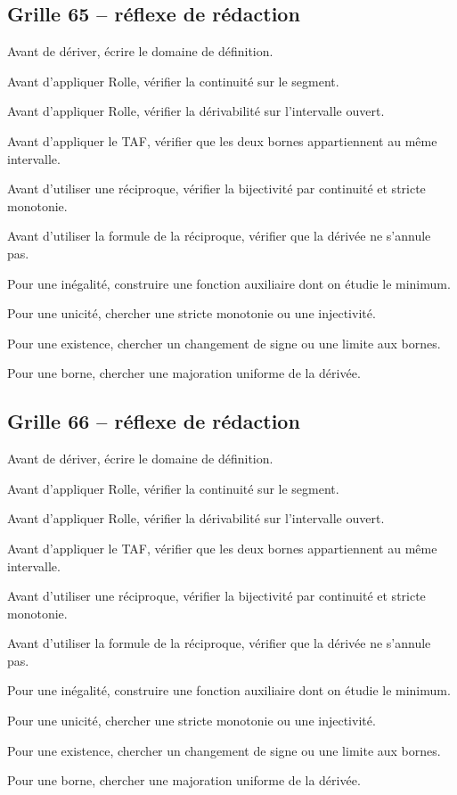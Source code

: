 \documentclass[11pt,a4paper]{article}
\begin{document}
\subsection*{Grille 65 -- réflexe de rédaction}

\begin{methodebox}

Avant de dériver, écrire le domaine de définition.

Avant d'appliquer Rolle, vérifier la continuité sur le segment.

Avant d'appliquer Rolle, vérifier la dérivabilité sur l'intervalle ouvert.

Avant d'appliquer le TAF, vérifier que les deux bornes appartiennent au même intervalle.

Avant d'utiliser une réciproque, vérifier la bijectivité par continuité et stricte monotonie.

Avant d'utiliser la formule de la réciproque, vérifier que la dérivée ne s'annule pas.

Pour une inégalité, construire une fonction auxiliaire dont on étudie le minimum.

Pour une unicité, chercher une stricte monotonie ou une injectivité.

Pour une existence, chercher un changement de signe ou une limite aux bornes.

Pour une borne, chercher une majoration uniforme de la dérivée.

\end{methodebox}

\subsection*{Grille 66 -- réflexe de rédaction}

\begin{methodebox}

Avant de dériver, écrire le domaine de définition.

Avant d'appliquer Rolle, vérifier la continuité sur le segment.

Avant d'appliquer Rolle, vérifier la dérivabilité sur l'intervalle ouvert.

Avant d'appliquer le TAF, vérifier que les deux bornes appartiennent au même intervalle.

Avant d'utiliser une réciproque, vérifier la bijectivité par continuité et stricte monotonie.

Avant d'utiliser la formule de la réciproque, vérifier que la dérivée ne s'annule pas.

Pour une inégalité, construire une fonction auxiliaire dont on étudie le minimum.

Pour une unicité, chercher une stricte monotonie ou une injectivité.

Pour une existence, chercher un changement de signe ou une limite aux bornes.

Pour une borne, chercher une majoration uniforme de la dérivée.

\end{methodebox}
\end{document}
